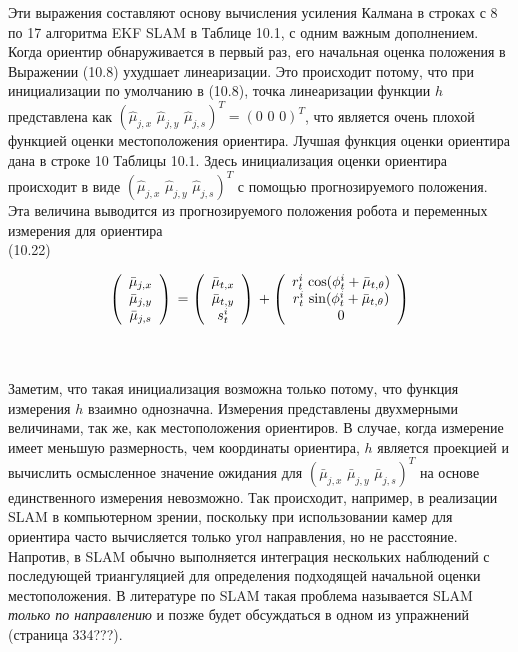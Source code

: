 \documentclass[10pt,a4paper]{article}
\begin{document}
Эти выражения составляют основу вычисления усиления Калмана в строках с 8 по 17 алгоритма EKF SLAM в Таблице 10.1, с одним важным дополнением. Когда ориентир обнаруживается в первый раз, его начальная оценка положения в Выражении (10.8) ухудшает линеаризации. Это происходит потому, что при инициализации по умолчанию в (10.8), точка линеаризации функции $h$ представлена как 
$(\hat{\mu}_{j,x}\,\,\hat{\mu}_{j,y}\,\,\hat{\mu}_{j,s})^T=(0\,\,0\,\,0)^T$, что является очень плохой функцией оценки местоположения ориентира. 
Лучшая функция оценки ориентира дана в строке 10 Таблицы 10.1.
Здесь инициализация оценки ориентира происходит в виде  $(\hat{\mu}_{j,x}\,\,\hat{\mu}_{j,y}\,\,\hat{\mu}_{j,s})^T$ с помощью прогнозируемого положения. Эта величина выводится из прогнозируемого положения робота и переменных измерения для ориентира\\

(10.22)
\begin{minipage}{0.2\textwidth}
\begin{equation*}
\left(\begin{array}{c} \bar{\mu}_{j,x}\\
\bar{\mu}_{j,y}\\
\bar{\mu}_{j,s}\\
\end{array} \right)\\
=\left(\begin{array}{c} \bar{\mu}_{t,x}\\
\bar{\mu}_{t,y}\\
s_t^i\\
\end{array} \right)\\
+\left(\begin{array}{c} r_t^i\,\cos(\phi_t^i+\bar{\mu}_{t,\theta})\\
r_t^i\,\sin(\phi_t^i+\bar{\mu}_{t,\theta})\\
0\\
\end{array} \right)
\end{equation*}
\end{minipage}\\
 \\
Заметим, что такая инициализация возможна только потому, что функция измерения $h$ взаимно однозначна. Измерения представлены двухмерными величинами, так же, как местоположения ориентиров. В случае, когда измерение имеет меньшую размерность, чем координаты ориентира, $h$ является проекцией и вычислить осмысленное значение ожидания для $(\bar{\mu}_{j,x}\,\,\bar{\mu}_{j,y}\,\,\bar{\mu}_{j,s})^T$ на основе единственного измерения невозможно. Так происходит, например, в реализации SLAM в компьютерном зрении, поскольку при использовании камер для ориентира часто вычисляется только угол направления, но не расстояние. Напротив, в SLAM обычно выполняется интеграция нескольких наблюдений с последующей триангуляцией для определения подходящей начальной оценки местоположения. В литературе по SLAM такая проблема называется  SLAM \textit{только по направлению} и позже будет обсуждаться в одном из упражнений (страница 334???).
\end{document}
